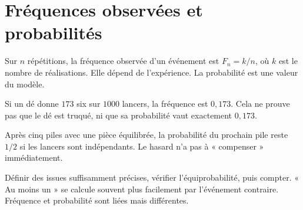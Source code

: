 \documentclass[../cours_3e.tex]{subfiles}
\begin{document}
\section{Fréquences observées et probabilités}
Sur $n$ répétitions, la fréquence observée d'un événement est $F_n=k/n$, où $k$ est le nombre de réalisations. Elle dépend de l'expérience. La probabilité est une valeur du modèle.
\begin{exemple}
Si un dé donne $173$ six sur $1000$ lancers, la fréquence est $0{,}173$. Cela ne prouve pas que le dé est truqué, ni que sa probabilité vaut exactement $0{,}173$.
\end{exemple}
Après cinq piles avec une pièce équilibrée, la probabilité du prochain pile reste $1/2$ si les lancers sont indépendants. Le hasard n'a pas à « compenser » immédiatement.
\begin{retenir}
Définir des issues suffisamment précises, vérifier l'équiprobabilité, puis compter. « Au moins un » se calcule souvent plus facilement par l'événement contraire. Fréquence et probabilité sont liées mais différentes.
\end{retenir}
\end{document}
